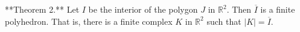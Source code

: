 **Theorem 2.** Let $I$ be the interior of the polygon $J$ in $\mathbb{R}^2$. Then $\overline{I}$ is a finite polyhedron. That is, there is a finite complex $K$ in $\mathbb{R}^2$ such that $|K| = \overline{I}$.
